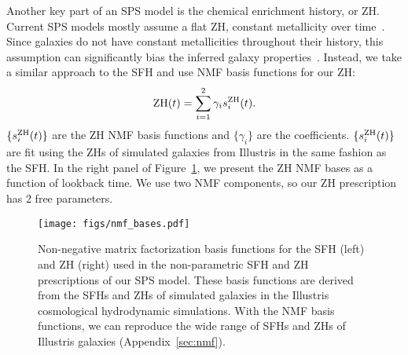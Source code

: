 Another key part of an SPS model is the chemical enrichment history, or ZH. 
Current SPS models mostly assume a flat ZH, constant metallicity over
time~\citep{carnall2019a, leja2019}.
Since galaxies do not have constant metallicities throughout their history,
this assumption can significantly bias the inferred galaxy
properties~\citep{thorne2021}. 
Instead, we take a similar approach to the SFH and use NMF basis functions for
our ZH:
\begin{equation}
    {\rm ZH}(t) = \sum\limits_{i=1}^2 \gamma_i s_i^{\rm ZH}(t).
\end{equation} 
$\{s_i^{\rm ZH}(t)\}$ are the ZH NMF basis functions and $\{\gamma_i\}$ are the
coefficients. 
$\{s_i^{\rm ZH}(t)\}$ are fit using the ZHs of simulated galaxies from
Illustris in the same fashion as the SFH. 
In the right panel of Figure~\ref{fig:nmf}, we present the ZH NMF bases as a
function of lookback time. 
We use two NMF components, so our ZH prescription has 2 free parameters. 

\begin{figure}
\begin{center}
\texttt{[image: figs/nmf\_bases.pdf]} 
    \caption{
        Non-negative matrix factorization basis functions for the SFH (left)
        and ZH (right) used in the non-parametric SFH and ZH prescriptions of
        our SPS model. 
        These basis functions are derived from the SFHs and ZHs of simulated
        galaxies in the Illustris cosmological hydrodynamic simulations. 
        With the NMF basis functions, we can reproduce the wide range of SFHs
        and ZHs of Illustris galaxies (Appendix~\ref{sec:nmf}).  
    }
    \label{fig:nmf}
\end{center}
\end{figure}

